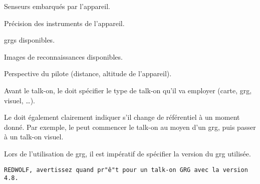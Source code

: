 \begin{e1}
\begin{e2}
\begin{e4}
			\begin{e5}
				
				\item Senseurs embarqués par l'appareil.
				\item Précision des instruments de l'appareil.
				\item \glspl{grg} disponibles.
				\item Images de reconnaissances disponibles.
				\item Perspective du pilote (distance, altitude de l'appareil).
				
			\end{e5}
			
			
			
			\begin{minipage}{\linewidth}
				
				\item Avant le talk-on, le \ja{} doit spécifier le type de talk-on qu'il va employer (carte, \gls{grg}, visuel, \ldots).
				
				Le \ja{} doit également clairement indiquer s'il change de référentiel à un moment donné. Par exemple, le \ja{} peut commencer le talk-on au moyen d'un \gls{grg}, puis passer à un talk-on visuel.
				
				Lors de l'utilisation de \gls{grg}, il est impératif de spécifier la version du \gls{grg} utilisée.
				\begin{lstlisting}[caption=Corrélation: Version GRG, label=9lversiongrg]
	REDWOLF, avertissez quand pr"ê"t pour un talk-on GRG avec la version 4.8.
				\end{lstlisting}
			\end{minipage}
			

\end{e4}
\end{e2}
\end{e1}
